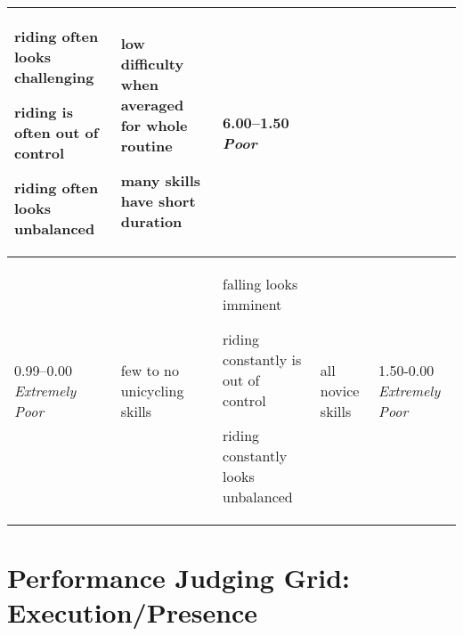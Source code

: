 \begin{minipage}{\textwidth}
\begin{longtable}{|p{1.5cm}|p{5cm}|p{5cm}|p{5cm}|p{1.5cm}|}
\begin{judging_items}%
\item riding often looks challenging
\item riding is often out of control
\item riding often looks unbalanced
\end{judging_items} &

\begin{judging_items}%
\item low difficulty when averaged for whole routine
\item many skills have short duration
\end{judging_items} &

6.00--1.50 \newline
\emph{Poor} \\
\hline

0.99--0.00 \newline
\emph{Extremely Poor} &

\begin{judging_items}%
\item few to no unicycling skills
\end{judging_items} &

\begin{judging_items}%
\item falling looks imminent
\item riding constantly is out of control
\item riding constantly looks unbalanced
\end{judging_items} &

\begin{judging_items}%
\item all novice skills
\end{judging_items} &

1.50-0.00 \newline
\emph{Extremely Poor} \\
\hline

\end{longtable}
\endgroup
\end{minipage}

\newpage
\section{Performance Judging Grid: Execution/Presence}

\begingroup
    \fontsize{7pt}{9pt}\selectfont
\setlength{\LTleft}{-2.5cm}

